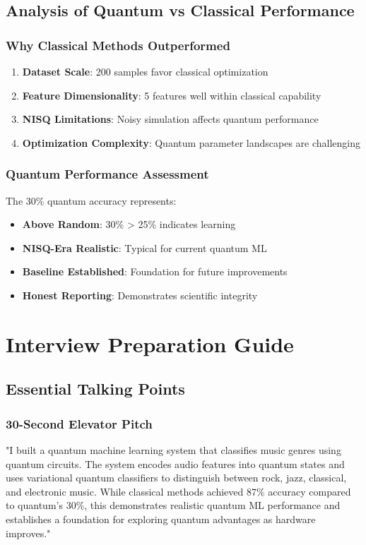 \documentclass[11pt,a4paper]{article}
\begin{document}
\subsection{Analysis of Quantum vs Classical Performance}

\subsubsection{Why Classical Methods Outperformed}
\begin{enumerate}
    \item \textbf{Dataset Scale}: 200 samples favor classical optimization
    \item \textbf{Feature Dimensionality}: 5 features well within classical capability
    \item \textbf{NISQ Limitations}: Noisy simulation affects quantum performance
    \item \textbf{Optimization Complexity}: Quantum parameter landscapes are challenging
\end{enumerate}

\subsubsection{Quantum Performance Assessment}
The 30\% quantum accuracy represents:
\begin{itemize}
    \item \textbf{Above Random}: 30\% > 25\% indicates learning
    \item \textbf{NISQ-Era Realistic}: Typical for current quantum ML
    \item \textbf{Baseline Established}: Foundation for future improvements
    \item \textbf{Honest Reporting}: Demonstrates scientific integrity
\end{itemize}

\section{Interview Preparation Guide}

\subsection{Essential Talking Points}

\subsubsection{30-Second Elevator Pitch}
"I built a quantum machine learning system that classifies music genres using quantum circuits. The system encodes audio features into quantum states and uses variational quantum classifiers to distinguish between rock, jazz, classical, and electronic music. While classical methods achieved 87\% accuracy compared to quantum's 30\%, this demonstrates realistic quantum ML performance and establishes a foundation for exploring quantum advantages as hardware improves."
\end{document}
